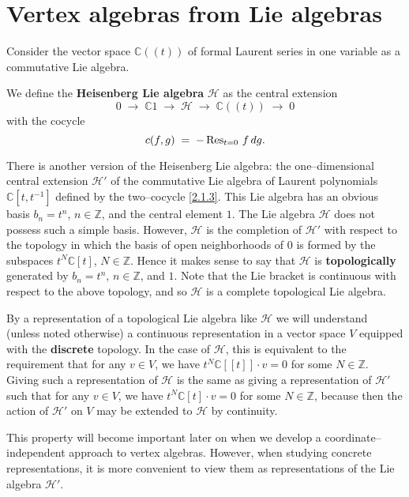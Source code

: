 \documentclass[12pt]{article}
\begin{document}
\section{Vertex algebras from Lie algebras}
Consider the vector space $\mathbb{C}((t))$ of formal Laurent series in one variable as a commutative Lie algebra.

\begin{definition}
    We define the \textbf{Heisenberg Lie algebra} $\mathcal{H}$ as the central extension
\begin{equation} \label{2.1.2}
0 \;\longrightarrow\; \mathbb{C}1 \;\longrightarrow\; \mathcal{H} \;\longrightarrow\; \mathbb{C}((t)) \;\longrightarrow\; 0
\end{equation}
with the cocycle
\begin{equation} \label{2.1.3}
c(f,g) \;=\; -\operatorname{Res}_{t=0}\, f\,dg.
\end{equation}

There is another version of the Heisenberg Lie algebra: the one–dimensional central extension $\mathcal{H}'$ of the commutative Lie algebra of Laurent polynomials $\mathbb{C}[t,t^{-1}]$ defined by the two–cocycle \eqref{2.1.3}.
This Lie algebra has an obvious basis $b_n = t^n$, $n \in \mathbb{Z}$, and the central element $1$. The Lie algebra $\mathcal{H}$ does not possess such a simple basis.
However, $\mathcal{H}$ is the completion of $\mathcal{H}'$ with respect to the topology in which the basis of open neighborhoods of $0$ is formed by the subspaces $t^N\mathbb{C}[t]$, $N\in\mathbb{Z}$.
Hence it makes sense to say that $\mathcal{H}$ is \textbf{topologically} generated by $b_n = t^n$, $n\in\mathbb{Z}$, and $1$.
Note that the Lie bracket is continuous with respect to the above topology, and so $\mathcal{H}$ is a complete topological Lie algebra.

By a representation of a topological Lie algebra like $\mathcal{H}$ we will understand (unless noted otherwise) a continuous representation in a vector space $V$ equipped with the \textbf{discrete} topology.
In the case of $\mathcal{H}$, this is equivalent to the requirement that for any $v\in V$, we have $t^N\mathbb{C}[[t]]\cdot v = 0$ for some $N\in\mathbb{Z}$.
Giving such a representation of $\mathcal{H}$ is the same as giving a representation of $\mathcal{H}'$ such that for any $v\in V$, we have $t^N\mathbb{C}[t]\cdot v = 0$ for some $N\in\mathbb{Z}$, because then the action of $\mathcal{H}'$ on $V$ may be extended to $\mathcal{H}$ by continuity.

This property will become important later on when we develop a coordinate–independent approach to vertex algebras. However, when studying concrete representations, it is more convenient to view them as representations of the Lie algebra $\mathcal{H}'$.
\end{definition}
\end{document}
